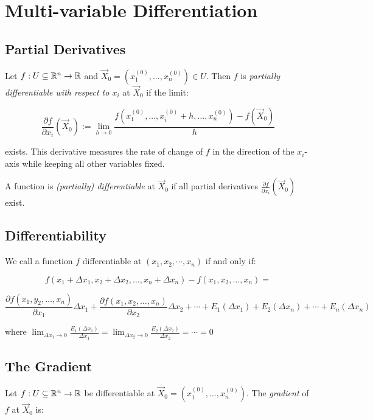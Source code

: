 \newpage
\section{Multi-variable Differentiation}

\subsection{Partial Derivatives}

Let \( f : U \subseteq \mathbb{R}^n \to \mathbb{R} \) and \( \vec{X}_0 = (x_1^{(0)}, \dots, x_n^{(0)}) 
\in U \). Then \( f \) is \emph{partially differentiable with respect to \( x_i \)} at 
\( \vec{X}_0 \) if the limit:

\[
    \frac{\partial f}{\partial x_i}(\vec{X}_0) := \lim_{h \to 0} \frac{f(x_1^{(0)}, \dots, x_i^{(0)} + h,
     \dots, x_n^{(0)}) - f(\vec{X}_0)}{h}
\]

exists. This derivative measures the rate of change of \( f \) in the direction of the \( x_i \)-axis 
while keeping all other variables fixed.

A function is \emph{(partially) differentiable} at \( \vec{X}_0 \) if all partial derivatives 
\( \frac{\partial f}{\partial x_i}(\vec{X}_0) \) exist.

\subsection{Differentiability}

We call a function \(f\) differentiable at \((x_1, x_2, \cdots, x_n)\) if and only if:

\[
    f(x_1 + \Delta x_1, x_2 + \Delta x_2, \dots, x_n + \Delta x_n) - f(x_1, x_2, \dots, x_n) = 
\]

\[
    \frac{\partial f(x_1, y_2, \dots, x_n)}{\partial x_1} \Delta x_1 + \frac{\partial f(x_1, x_2, 
    \dots, x_n)}{\partial x_2} \Delta x_2 + \cdots + E_1(\Delta x_1) + E_2(\Delta x_n) + \cdots + 
    E_n(\Delta x_n)
\]

where \(\lim_{\Delta x_1 \to 0}\frac{E_1(\Delta x_1)}{\Delta x_1} = \lim_{\Delta x_2 \to 0}
\frac{E_2(\Delta x_2)}{\Delta x_2} = \cdots = 0\)

\subsection{The Gradient}

Let \( f : U \subseteq \mathbb{R}^n \to \mathbb{R} \) be differentiable at \( \vec{X}_0 = (x_1^{(0)}, 
\dots, x_n^{(0)}) \). The \emph{gradient} of \( f \) at \( \vec{X}_0 \) is:


